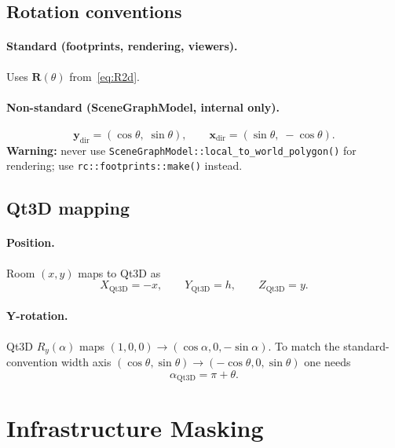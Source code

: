 \documentclass[a4paper, 11pt]{article}
\newcommand{\vect}[1]{\bm{#1}}
\newcommand{\mat}[1]{\bm{#1}}
\begin{document}
\subsection{Rotation conventions}

\paragraph{Standard (footprints, rendering, viewers).}
Uses $\mat{R}(\theta)$ from~\eqref{eq:R2d}.

\paragraph{Non-standard (SceneGraphModel, internal only).}
\begin{equation}
  \vect{y}_{\text{dir}} = (\cos\theta,\; \sin\theta),
  \qquad
  \vect{x}_{\text{dir}} = (\sin\theta,\; -\cos\theta).
\end{equation}
\textbf{Warning:} never use \texttt{SceneGraphModel::local\_to\_world\_polygon()}
for rendering; use \texttt{rc::footprints::make()} instead.

\subsection{Qt3D mapping}

\paragraph{Position.}
Room $(x, y)$ maps to Qt3D as
\begin{equation}
  X_{\text{Qt3D}} = -x, \qquad
  Y_{\text{Qt3D}} = h,  \qquad
  Z_{\text{Qt3D}} = y.
\end{equation}

\paragraph{Y-rotation.}
Qt3D $R_y(\alpha)$ maps $(1,0,0) \to (\cos\alpha, 0, -\sin\alpha)$.
To match the standard-convention width axis
$(\cos\theta, \sin\theta) \to (-\cos\theta, 0, \sin\theta)$ one needs
\begin{equation}\label{eq:qt3d-rot}
  \alpha_{\text{Qt3D}} = \pi + \theta.
\end{equation}

\section{Infrastructure Masking}\label{sec:masking}
\end{document}

